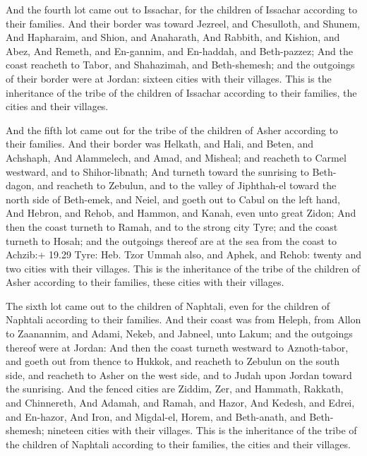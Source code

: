  And the fourth lot came out to Issachar, for the
children of Issachar according to their families.  And
their border was toward Jezreel, and Chesulloth, and Shunem,
 And Hapharaim, and Shion, and Anaharath,  And
Rabbith, and Kishion, and Abez,  And Remeth, and En-gannim,
and En-haddah, and Beth-pazzez;  And the coast reacheth to
Tabor, and Shahazimah, and Beth-shemesh; and the outgoings of their
border were at Jordan: sixteen cities with their villages. 
This is the inheritance of the tribe of the children of Issachar
according to their families, the cities and their villages.

 And the fifth lot came out for the tribe of the children
of Asher according to their families.  And their border was
Helkath, and Hali, and Beten, and Achshaph,  And
Alammelech, and Amad, and Misheal; and reacheth to Carmel westward, and
to Shihor-libnath;  And turneth toward the sunrising to
Beth-dagon, and reacheth to Zebulun, and to the valley of Jiphthah-el
toward the north side of Beth-emek, and Neiel, and goeth out to Cabul on
the left hand,  And Hebron, and Rehob, and Hammon, and
Kanah, even unto great Zidon;  And then the coast turneth
to Ramah, and to the strong city Tyre; and the coast turneth to Hosah;
and the outgoings thereof are at the sea from the coast to Achzib:+
19.29 Tyre: Heb. Tzor  Ummah also, and Aphek, and Rehob:
twenty and two cities with their villages.  This is the
inheritance of the tribe of the children of Asher according to their
families, these cities with their villages.

 The sixth lot came out to the children of Naphtali, even
for the children of Naphtali according to their families. 
And their coast was from Heleph, from Allon to Zaanannim, and Adami,
Nekeb, and Jabneel, unto Lakum; and the outgoings thereof were at
Jordan:  And then the coast turneth westward to
Aznoth-tabor, and goeth out from thence to Hukkok, and reacheth to
Zebulun on the south side, and reacheth to Asher on the west side, and
to Judah upon Jordan toward the sunrising.  And the fenced
cities are Ziddim, Zer, and Hammath, Rakkath, and Chinnereth,
 And Adamah, and Ramah, and Hazor,  And
Kedesh, and Edrei, and En-hazor,  And Iron, and Migdal-el,
Horem, and Beth-anath, and Beth-shemesh; nineteen cities with their
villages.  This is the inheritance of the tribe of the
children of Naphtali according to their families, the cities and their
villages.

